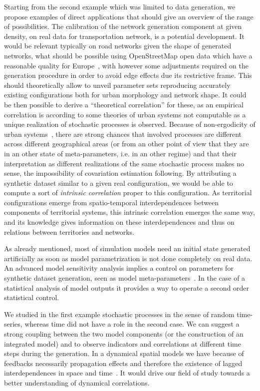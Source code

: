 \documentclass{article}
\begin{document}
Starting from the second example which was limited to data generation, we propose examples of direct applications that should give an overview of the range of possibilities. The calibration of the network generation component at given density, on real data for transportation network, is a potential development. It would be relevant typically on road networks given the shape of generated networks, what should be possible using OpenStreetMap open data which have a reasonable quality for Europe~\cite{girres2010quality}, with however some adjustments required on the generation procedure in order to avoid edge effects due its restrictive frame. This should theoretically allow to unveil parameter sets reproducing accurately existing configurations both for urban morphology and network shape. It could be then possible to derive a ``theoretical correlation'' for these, as an empirical correlation is according to some theories of urban systems not computable as a unique realization of stochastic processes is observed. Because of non-ergodicity of urban systems~\cite{pumain2012urban}, there are strong chances that involved processes are different across different geographical areas (or from an other point of view that they are in an other state of meta-parameters, i.e. in an other regime) and that their interpretation as different realizations of the same stochastic process makes no sense, the impossibility of covariation estimation following. By attributing a synthetic dataset similar to a given real configuration, we would be able to compute a sort of \emph{intrinsic correlation} proper to this configuration. As territorial configurations emerge from spatio-temporal interdependences between components of territorial systems, this intrinsic correlation emerges the same way, and its knowledge gives information on these interdependences and thus on relations between territories and networks.

As already mentioned, most of simulation models need an initial state generated artificially as soon as model parametrization is not done completely on real data. An advanced model sensitivity analysis implies a control on parameters for synthetic dataset generation, seen as model meta-parameters~\cite{raimbault2018space}. In the case of a statistical analysis of model outputs it provides a way to operate a second order statistical control.

We studied in the first example stochastic processes in the sense of random time-series, whereas time did not have a role in the second case. We can suggest a strong coupling between the two model components (or the construction of an integrated model) and to observe indicators and correlations at different time steps during the generation. In a dynamical spatial models we have because of feedbacks necessarily propagation effects and therefore the existence of lagged interdependences in space and time~\cite{pigozzi1980interurban}. It would drive our field of study towards a better understanding of dynamical correlations.
\end{document}
